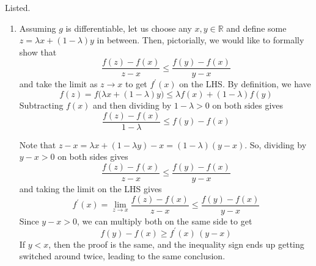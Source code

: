   \begin{solution}
  Listed. 
  \begin{enumerate}
      \item Assuming $g$ is differentiable, let us choose any $x, y \in \mathbb{R}$ and define some $z = \lambda x + (1 - \lambda)y$ in between. Then, pictorially, we would like to formally show that 
      \begin{equation}
        \frac{f(z) - f(x)}{z - x} \leq \frac{f(y) - f(x)}{y - x}
      \end{equation}
      and take the limit as $z \rightarrow x$ to get $f^\prime(x)$ on the LHS. By definition, we have 
      \begin{equation}
        f(z) = f\big( \lambda x + (1 - \lambda) y\big) \leq \lambda f(x) + (1 - \lambda) f(y)
      \end{equation}
      Subtracting $f(x)$ and then dividing by $1 - \lambda > 0$ on both sides gives 
      \begin{equation}
        \frac{f(z) - f(x)}{1 - \lambda} \leq f(y) - f(x)
      \end{equation}
       
      Note that $z - x = \lambda x + (1 - \lambda y) - x = (1 - \lambda)(y - x)$. So, dividing by $y - x > 0$ on both sides gives 
      \begin{equation}
        \frac{f(z) - f(x)}{z - x} \leq \frac{f(y) - f(x)}{y - x}
      \end{equation}
      and taking the limit on the LHS gives 
      \begin{equation}
        f^\prime (x) = \lim_{z \rightarrow x} \frac{f(z) - f(x)}{z - x} \leq \frac{f(y) - f(x)}{y - x}
      \end{equation}
      Since $y - x > 0$, we can multiply both on the same side to get 
      \begin{equation}
        f(y) - f(x) \geq f^\prime (x) \, (y - x)
      \end{equation}
      If $y < x$, then the proof is the same, and the inequality sign ends up getting switched around twice, leading to the same conclusion. 
      

\end{enumerate}
\end{solution}
